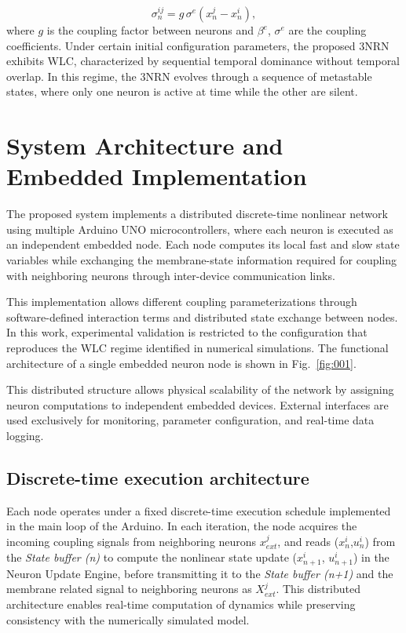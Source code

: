 \documentclass[lettersize,journal]{IEEEtran}
\begin{document}
\begin{equation}
\label{Eq6}
\sigma_n^{ij} = g \, \sigma^e \left( x_n^j - x_n^i \right),
\end{equation}
where $g$ is the coupling factor between neurons and $\beta^e$, $\sigma^e$ are the coupling coefficients. Under certain initial configuration parameters, the proposed 3NRN exhibits WLC, characterized by sequential temporal dominance without temporal overlap. In this regime, the 3NRN evolves through a sequence of metastable states, where only one neuron is active at time while the other are silent. 

\section{System Architecture and Embedded Implementation}


The proposed system implements a distributed discrete-time nonlinear network using multiple Arduino UNO microcontrollers, where each neuron is executed as an independent embedded node. Each node computes its local fast and slow state variables while exchanging the membrane-state information required for coupling with neighboring neurons through inter-device communication links.

This implementation allows different coupling parameterizations through software-defined interaction terms and distributed state exchange between nodes. In this work, experimental validation is restricted to the configuration that reproduces the WLC regime identified in numerical simulations. The functional architecture of a single embedded neuron node is shown in Fig.~\ref{fig:001}.

This distributed structure allows physical scalability of the network by assigning neuron computations to independent embedded devices. External interfaces are used exclusively for monitoring, parameter configuration, and real-time data logging.

\subsection{Discrete-time execution architecture}

Each node operates under a fixed discrete-time execution schedule implemented in the main loop of the Arduino. In each iteration, the node acquires the incoming coupling signals from neighboring neurons $x^j_{ext}$, and reads ($x_n^i$,$u_{n}^i$) from the \textit{State buffer (n)}  to compute the nonlinear state update ($x_{n+1}^i$, $u_{n+1}^i$) in the Neuron Update Engine, before transmitting it to the \textit{State buffer (n+1)} and the membrane related signal to neighboring neurons as $X_{ext}^j$. This distributed architecture enables real-time computation of dynamics while preserving consistency with the numerically simulated model.
\end{document}
